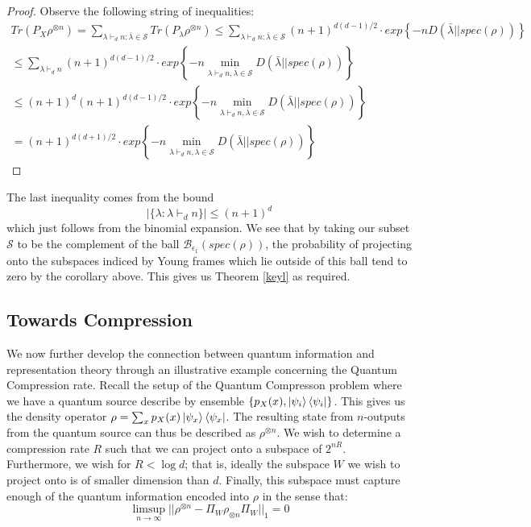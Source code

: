 \documentclass[11pt]{article}%
\begin{document}
\begin{proof}
Observe the following string of inequalities:
  \begin{gather*}
      Tr(P_X\rho^{\otimes n}) = \sum_{\lambda \vdash_d n: \bar{\lambda} \in \mathcal{S}} Tr(P_\lambda\rho^{\otimes n}) \leq \sum_{\lambda \vdash_d n: \bar{\lambda} \in \mathcal{S}} (n+1)^{d(d-1)/2} \cdot exp \left\{ -n D(\bar{\lambda}||spec(\rho)) \right\} \\
      \leq
            \sum_{\lambda \vdash_d n} (n+1)^{d(d-1)/2} \cdot exp \left\{ -n \min_{\lambda \vdash_d n, \bar{\lambda} \in \mathcal{S}} D(\bar{\lambda}||spec(\rho)) \right\} \\
      \leq (n+1)^d  (n+1)^{d(d-1)/2} \cdot exp \left\{ -n \min_{\lambda \vdash_d n, \bar{\lambda} \in \mathcal{S}} D(\bar{\lambda}||spec(\rho)) \right\} \\
      = (n+1)^{d(d+1)/2} \cdot exp\left\{-n \min_{\lambda \vdash_d n, \bar{\lambda} \in \mathcal{S}}{D(\bar{\lambda}||spec(\rho))} \right\}
  \end{gather*}
\end{proof}
\noindent The last inequality comes from the bound
\begin{equation}\label{framebound}
|\{\lambda: \lambda \vdash_d n \}| \leq (n+1)^d
\end{equation}
which just follows from the binomial expansion.
\noindent We see that by taking our subset $\mathcal{S}$ to be the complement of the ball $\mathcal{B}_{\epsilon_1}(spec(\rho))$, the probability of projecting onto the subspaces indiced by Young frames which lie outside of this ball tend to zero by the corollary above. This gives us Theorem \ref{keyl} as required.

\subsection{Towards Compression}
We now further develop the connection between quantum information and representation theory through an illustrative example concerning the Quantum Compression rate. Recall the setup of the Quantum Compresson problem where we have a quantum source describe by ensemble $\{p_X(x), \ket{\psi_i}\bra{\psi_i}\}$. This gives us the density operator $\rho = \sum_x p_X(x)\ket{\psi_x}\bra{\psi_x}$. The resulting state from $n$-outputs from the quantum source can thus be described as $\rho^{\otimes n}$. We wish to determine a compression rate $R$ such that we can project onto a subspace of $2^{nR}$. Furthermore, we wish for $R < \log{d}$; that is, ideally the subspace $W$ we wish to project onto is of smaller dimension than $d$. Finally, this subspace must capture enough of the quantum information encoded into $\rho$ in the sense that:
\begin{equation*}
  \limsup_{n \rightarrow \infty} || \rho^{\otimes n} - \Pi_{W}\rho_{\otimes n}\Pi_W ||_1 = 0
\end{equation*}
\end{document}
